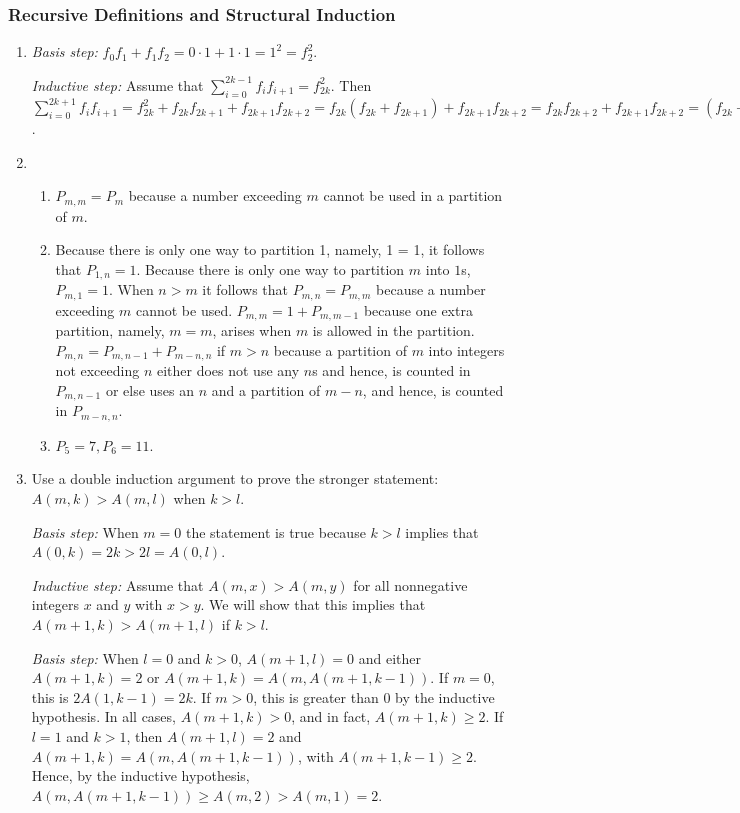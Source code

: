 \documentclass{../../cls/sig-alternate-05-2015}
\begin{document}
\subsubsection{Recursive Definitions and Structural Induction}
\begin{enumerate}
\item \textit{Basis step:} $f_0 f_1 + f_1 f_2 = 0 \cdot 1 + 1 \cdot 1 = 1^2 = f_2^2$.

\textit{Inductive step:} Assume that $\sum_{i = 0}^{2k - 1} f_i f_{i + 1} = f_{2k}^2$.
Then $\sum_{i = 0}^{2k + 1} f_i f_{i + 1} = f_{2k}^2 + f_{2k} f_{2k + 1} + f_{2k + 1} f_{2k + 2} = f_{2k} (f_{2k} + f_{2k + 1}) + f_{2k + 1} f_{2k + 2} = f_{2k} f_{2k + 2} + f_{2k + 1} f_{2k + 2} = (f_{2k} + f_{2k + 1}) f_{2k + 2} = f_{2k + 2}^2$.

\item \begin{enumerate}
    \item $P_{m, m} = P_m$ because a number exceeding $m$ cannot be used in a partition of $m$.
    \item Because there is only one way to partition 1, namely, 1 = 1, it follows that $P_{1,n} = 1$.
    Because there is only one way to partition $m$ into $1$s, $P_{m,1} = 1$. When $n > m$ it follows that $P_{m, n} = P_{m, m}$ because a number exceeding $m$ cannot be used.
    $P_{m, m} = 1 + P_{m, m - 1}$ because one extra partition,
    namely, $m = m$,
    arises when $m$ is allowed in the partition.
    $P_{m, n} = P_{m, n - 1} + P_{m - n, n}$ if $m > n$ because a partition of $m$ into integers not exceeding $n$ either does not use any $n$s and hence,
    is counted in $P_{m, n - 1}$ or else uses an $n$ and a partition of $m - n$, and hence, is counted in $P_{m - n, n}$.
    \item $P_5 = 7, P_6 = 11$.
\end{enumerate}

\item Use a double induction argument to prove the stronger statement:
$A(m, k) > A(m, l)$ when $k > l$.

\textit{Basis step:}
When $m = 0$ the statement is true because $k > l$ implies that $A(0, k) = 2k > 2l = A(0, l)$.

\textit{Inductive step:} Assume that $A(m, x) > A(m, y)$ for all nonnegative integers $x$ and $y$ with $x > y$.
We will show that this implies that $A(m + 1, k) > A(m + 1, l)$ if $k > l$.

\textit{Basis step:} When $l = 0$ and $k > 0$, $A(m + 1, l) = 0$ and either $A(m + 1, k) = 2$ or $A(m + 1, k) = A(m, A(m + 1, k - 1))$.
If $m = 0$, this is $2A(1, k - 1) = 2k$.
If $m > 0$,
this is greater than 0 by the inductive hypothesis.
In all cases, $A(m + 1, k) > 0$,
and in fact, $A(m + 1, k) \ge 2$.
If $l = 1$ and $k > 1$,
then $A(m + 1, l) = 2$ and $A(m + 1, k) = A(m, A(m + 1, k - 1))$,
with $A(m + 1, k - 1) \ge 2$.
Hence, by the inductive hypothesis,
$A(m, A(m + 1, k - 1)) \ge A(m, 2) > A(m, 1) = 2$.


\end{enumerate}
\end{document}
